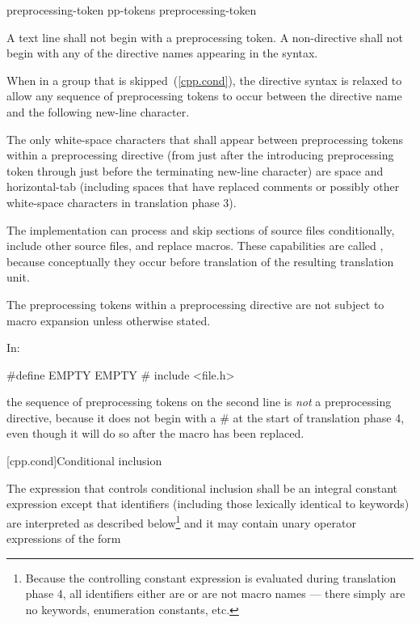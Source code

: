 \begin{bnf}
\br
    preprocessing-token\br
    pp-tokens preprocessing-token
\end{bnf}

\begin{bnf}
\br
\end{bnf}

\pnum
A text line shall not begin with a \tcode{\#} preprocessing token.
A non-directive shall not begin with any of the directive names appearing in the
syntax.

\pnum
When in a group that is skipped~(\ref{cpp.cond}), the directive
syntax is relaxed to allow any sequence of preprocessing tokens to occur between
the directive name and the following new-line character.

\pnum
The only white-space characters that shall appear
between preprocessing tokens
within a preprocessing directive
(from just after the introducing
\tcode{\#}
preprocessing token through just before the terminating new-line character)
are space and horizontal-tab
(including spaces that have replaced comments
or possibly other white-space characters
in translation phase 3).

\pnum
The implementation can
process and skip sections of source files conditionally,
include other source files,
and replace macros.
These capabilities are called
,
because conceptually they occur
before translation of the resulting translation unit.

\pnum
The preprocessing tokens within a preprocessing directive
are not subject to macro expansion unless otherwise stated.

\enterexample In:

\begin{codeblock}
#define EMPTY
EMPTY   #   include <file.h>
\end{codeblock}

the sequence of preprocessing tokens on the second line is \textit{not}
a preprocessing directive, because it does not begin with a \# at the start of
translation phase 4, even though it will do so after the macro 
has been replaced.\exitexample

[cpp.cond]{Conditional inclusion}%
%

\pnum
The expression that controls conditional inclusion
shall be an integral constant expression except that
identifiers
(including those lexically identical to keywords)
are interpreted as described below\footnote{Because the controlling constant expression is evaluated
during translation phase 4,
all identifiers either are or are not macro names ---
there simply are no keywords, enumeration constants, etc.}
and it may contain unary operator expressions of the form

